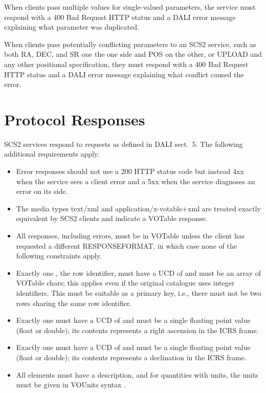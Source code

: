 \documentclass[11pt,a4paper]{ivoa}
\begin{document}
When clients pass multiple values for single-valued parameters, the
service must respond with a 400 Bad Request HTTP status and a DALI error
message explaining what parameter was duplicated.

When clients pass potentially conflicting parameters to an SCS2 service,
such as both RA, DEC, and SR one the one side and POS on the other, or
UPLOAD and any other positional specification, they must respond with a
400 Bad Request HTTP status and a DALI error message explaining what
conflict caused the error.


\section{Protocol Responses}

SCS2 services respond to requests as defined in DALI sect.~5.  The
following additional requirements apply:

\begin{itemize}
\item Error responses should not use a 200 HTTP status code but instead
4xx when the service sees a client error and a 5xx when the service
diagnoses an error on its side.

\item The media types text/xml and application/x-votable+xml are treated
exactly equivalent by SCS2 clients and indicate a VOTable response.

\item All responses, including errors, must be in VOTable unless the
client has requested a different RESPONSEFORMAT, in which case none of
the following constraints apply.

\item Exactly one , the row identifier, must have a UCD of
 and must be an array of VOTable chars; this
applies even if the original catalogue uses integer identifiers.  This
must be suitable as a primary key, i.e., there must not be two rows
sharing the same row identifier.

\item Exactly one  must have a UCD of
 and must be a single floating point value
(float or double); its contents represents a right ascension in the ICRS
frame.

\item Exactly one  must have a UCD of
 and must be a single floating point value
(float or double); its contents represents a declination in the ICRS
frame.

\item All  elements must have a description, and for
quantities with units, the units must be given in VOUnits syntax
\citep{2014ivoa.spec.0523D}.

\end{itemize}
\end{document}
